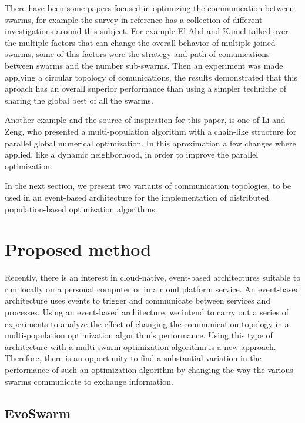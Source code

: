 \documentclass[runningheads]{llncs}
\begin{document}
There have been some papers focused in optimizing the communication
between swarms, for example the survey in reference \cite{b15} has a
collection of different investigations around this subject. For
example El-Abd and Kamel talked over the multiple factors that can
change the overall behavior of multiple joined swarms, some of this factors
were the strategy and path of comunications between swarms and the number sub-swarms. 
Then an experiment was made applying a circular topology of comunications, 
the results demonstrated that this aproach has an overall superior performance 
than using a simpler techniche of sharing the global best of all the swarms\cite{b16}. 

Another example and the source of inspiration for this paper, is one
of Li and Zeng, %
who presented a multi-population algorithm with a chain-like structure for parallel global
numerical optimization. In this aproximation a few changes where applied, like a dynamic neighborhood,
in order to improve the parallel optimization\cite{b17}.


In the next section, we present two variants of communication topologies,
to be used in an event-based architecture for the implementation of 
distributed population-based optimization algorithms.


\section{Proposed method}

Recently, there is an interest in cloud-native, event-based architectures
suitable to run locally on a personal computer or in a cloud platform service.
An event-based architecture uses events to trigger and communicate between
services and processes. Using an event-based architecture, we intend to carry
out a series of experiments to analyze the effect of changing the communication
topology in a multi-population optimization algorithm's performance. Using this
type of architecture with a multi-swarm optimization algorithm is a new
approach. Therefore, there is an opportunity to find a substantial variation in
the performance of such an optimization algorithm by changing the way the
various swarms communicate to exchange information.

\subsection{EvoSwarm}
\end{document}
